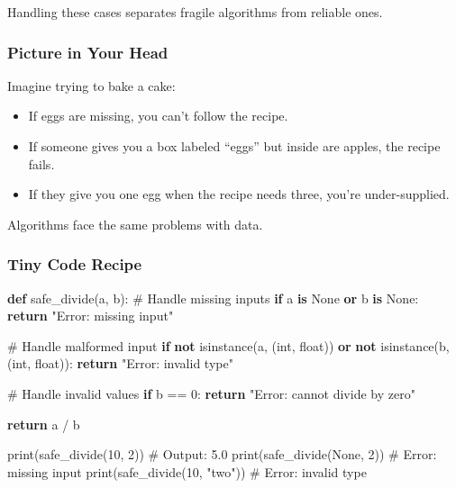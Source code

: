 \documentclass[
  letterpaper,
  DIV=11,
  numbers=noendperiod]{scrreprt}
\newenvironment{Shaded}{\begin{snugshade}}{\end{snugshade}}
\newcommand{\BuiltInTok}[1]{\textcolor[rgb]{0.00,0.23,0.31}{#1}}
\newcommand{\CommentTok}[1]{\textcolor[rgb]{0.37,0.37,0.37}{#1}}
\newcommand{\ControlFlowTok}[1]{\textcolor[rgb]{0.00,0.23,0.31}{\textbf{#1}}}
\newcommand{\DecValTok}[1]{\textcolor[rgb]{0.68,0.00,0.00}{#1}}
\newcommand{\KeywordTok}[1]{\textcolor[rgb]{0.00,0.23,0.31}{\textbf{#1}}}
\newcommand{\NormalTok}[1]{\textcolor[rgb]{0.00,0.23,0.31}{#1}}
\newcommand{\OperatorTok}[1]{\textcolor[rgb]{0.37,0.37,0.37}{#1}}
\newcommand{\StringTok}[1]{\textcolor[rgb]{0.13,0.47,0.30}{#1}}
\newcommand{\VariableTok}[1]{\textcolor[rgb]{0.07,0.07,0.07}{#1}}
\providecommand{\tightlist}{%
  \setlength{\itemsep}{0pt}\setlength{\parskip}{0pt}}
\begin{document}
Handling these cases separates fragile algorithms from reliable ones.

\subsubsection{Picture in Your Head}\label{picture-in-your-head-16}

Imagine trying to bake a cake:

\begin{itemize}
\tightlist
\item
  If eggs are missing, you can't follow the recipe.
\item
  If someone gives you a box labeled ``eggs'' but inside are apples, the
  recipe fails.
\item
  If they give you one egg when the recipe needs three, you're
  under-supplied.
\end{itemize}

Algorithms face the same problems with data.

\subsubsection{Tiny Code Recipe}\label{tiny-code-recipe-15}

\begin{Shaded}
\begin{Highlighting}[]
\KeywordTok{def}\NormalTok{ safe\_divide(a, b):}
    \CommentTok{\# Handle missing inputs}
    \ControlFlowTok{if}\NormalTok{ a }\KeywordTok{is} \VariableTok{None} \KeywordTok{or}\NormalTok{ b }\KeywordTok{is} \VariableTok{None}\NormalTok{:}
        \ControlFlowTok{return} \StringTok{"Error: missing input"}
    
    \CommentTok{\# Handle malformed input}
    \ControlFlowTok{if} \KeywordTok{not} \BuiltInTok{isinstance}\NormalTok{(a, (}\BuiltInTok{int}\NormalTok{, }\BuiltInTok{float}\NormalTok{)) }\KeywordTok{or} \KeywordTok{not} \BuiltInTok{isinstance}\NormalTok{(b, (}\BuiltInTok{int}\NormalTok{, }\BuiltInTok{float}\NormalTok{)):}
        \ControlFlowTok{return} \StringTok{"Error: invalid type"}
    
    \CommentTok{\# Handle invalid values}
    \ControlFlowTok{if}\NormalTok{ b }\OperatorTok{==} \DecValTok{0}\NormalTok{:}
        \ControlFlowTok{return} \StringTok{"Error: cannot divide by zero"}
    
    \ControlFlowTok{return}\NormalTok{ a }\OperatorTok{/}\NormalTok{ b}

\BuiltInTok{print}\NormalTok{(safe\_divide(}\DecValTok{10}\NormalTok{, }\DecValTok{2}\NormalTok{))   }\CommentTok{\# Output: 5.0}
\BuiltInTok{print}\NormalTok{(safe\_divide(}\VariableTok{None}\NormalTok{, }\DecValTok{2}\NormalTok{)) }\CommentTok{\# Error: missing input}
\BuiltInTok{print}\NormalTok{(safe\_divide(}\DecValTok{10}\NormalTok{, }\StringTok{"two"}\NormalTok{)) }\CommentTok{\# Error: invalid type}
\end{Highlighting}
\end{Shaded}
\end{document}
